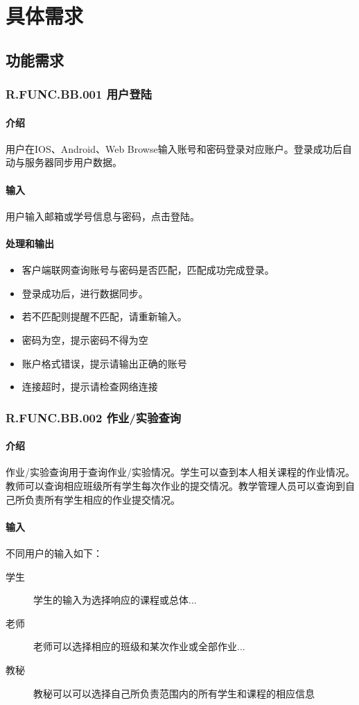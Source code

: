 \chapter{具体需求}
  \section{功能需求}
    \subsection{R.FUNC.BB.001 用户登陆}
    \subsubsection{介绍}
    用户在IOS、Android、Web Browse输入账号和密码登录对应账户。登录成功后自动与服务器同步用户数据。
    \subsubsection{输入}
    用户输入邮箱或学号信息与密码，点击登陆。
    \subsubsection{处理和输出}
    \begin{itemize}
      \item 客户端联网查询账号与密码是否匹配，匹配成功完成登录。
      \item 登录成功后，进行数据同步。
      \item 若不匹配则提醒不匹配，请重新输入。
      \item 密码为空，提示密码不得为空
      \item 账户格式错误，提示请输出正确的账号
      \item 连接超时，提示请检查网络连接
    \end{itemize}

\subsection{R.FUNC.BB.002 作业/实验查询}
      \subsubsection{介绍}
      作业/实验查询用于查询作业/实验情况。学生可以查到本人相关课程的作业情况。教师可以查询相应班级所有学生每次作业的提交情况。教学管理人员可以查询到自己所负责所有学生相应的作业提交情况。
      \subsubsection{输入}
      不同用户的输入如下：
      \begin{description}
        \item[学生] 学生的输入为选择响应的课程或总体...
        \item[老师] 老师可以选择相应的班级和某次作业或全部作业...
        \item[教秘] 教秘可以可以选择自己所负责范围内的所有学生和课程的相应信息
      \end{description}

